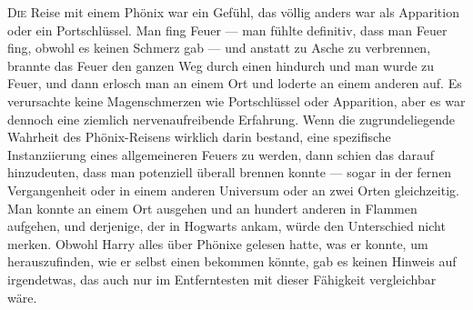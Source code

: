 
\lettrine{D}{ie} Reise mit einem Phönix war ein Gefühl, das völlig anders war als Apparition oder ein Portschlüssel. Man fing Feuer — man fühlte definitiv, dass man Feuer fing, obwohl es keinen Schmerz gab — und anstatt zu Asche zu verbrennen, brannte das Feuer den ganzen Weg durch einen hindurch und man wurde zu Feuer, und dann erlosch man an einem Ort und loderte an einem anderen auf. Es verursachte keine Magenschmerzen wie Portschlüssel oder Apparition, aber es war dennoch eine ziemlich nervenaufreibende Erfahrung. Wenn die zugrundeliegende Wahrheit des Phönix-Reisens wirklich darin bestand, eine spezifische Instanziierung eines allgemeineren Feuers zu werden, dann schien das darauf hinzudeuten, dass man potenziell überall brennen konnte — sogar in der fernen Vergangenheit oder in einem anderen Universum oder an zwei Orten gleichzeitig. Man konnte an einem Ort ausgehen und an hundert anderen in Flammen aufgehen, und derjenige, der in Hogwarts ankam, würde den Unterschied nicht merken. Obwohl Harry alles über Phönixe gelesen hatte, was er konnte, um herauszufinden, wie er selbst einen bekommen könnte, gab es keinen Hinweis auf irgendetwas, das auch nur im Entferntesten mit dieser Fähigkeit vergleichbar wäre.

